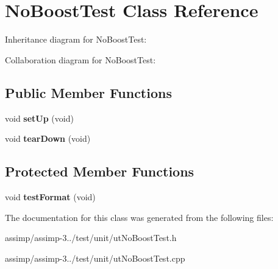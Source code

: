\hypertarget{class_no_boost_test}{\section{No\+Boost\+Test Class Reference}
\label{class_no_boost_test}
}


Inheritance diagram for No\+Boost\+Test\+:


Collaboration diagram for No\+Boost\+Test\+:
\subsection*{Public Member Functions}
\begin{DoxyCompactItemize}
\item 
\hypertarget{class_no_boost_test_a659b69b884478cd6b40f4db14544b8c1}{void {\bfseries set\+Up} (void)}\label{class_no_boost_test_a659b69b884478cd6b40f4db14544b8c1}

\item 
\hypertarget{class_no_boost_test_a6a057ada7404f184522be3df3759900d}{void {\bfseries tear\+Down} (void)}\label{class_no_boost_test_a6a057ada7404f184522be3df3759900d}

\end{DoxyCompactItemize}
\subsection*{Protected Member Functions}
\begin{DoxyCompactItemize}
\item 
\hypertarget{class_no_boost_test_a6cf0335b359febf265509be5b2091e38}{void {\bfseries test\+Format} (void)}\label{class_no_boost_test_a6cf0335b359febf265509be5b2091e38}

\end{DoxyCompactItemize}


The documentation for this class was generated from the following files\+:\begin{DoxyCompactItemize}
\item 
assimp/assimp-\/3../test/unit/ut\+No\+Boost\+Test.\+h\item 
assimp/assimp-\/3../test/unit/ut\+No\+Boost\+Test.\+cpp\end{DoxyCompactItemize}
